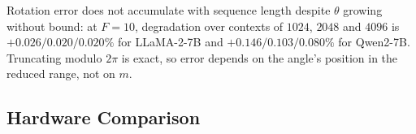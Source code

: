 \documentclass[conference]{IEEEtran}
\begin{document}
Rotation error does not accumulate with sequence length despite $\theta$
growing without bound: at $F=10$, degradation over contexts of $1024$, $2048$
and $4096$ is $+0.026/0.020/0.020\%$ for LLaMA-2-7B and
$+0.146/0.103/0.080\%$ for Qwen2-7B. Truncating modulo $2\pi$ is exact, so
error depends on the angle's position in the reduced range, not on $m$.

\subsection{Hardware Comparison}
\label{sec:hw}

\begin{table}[t]
\caption{Complete RoPE units synthesised on the same 45\,nm flow. Energy is
power at the 500\,MHz operating point. $\dagger$ marks a design that consumes
$\sin/\cos$ it does not generate, and is therefore not a complete unit.}
\label{tab:perf}
\centering
{}
\end{table}
\end{document}
